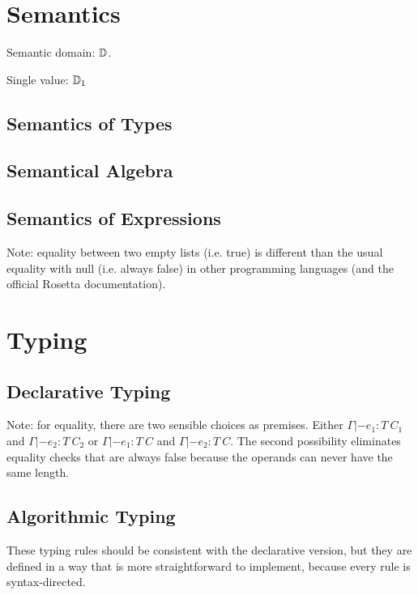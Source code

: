 \documentclass[english,11pt,a4paper]{article}
\begin{document}
\section{Semantics}

Semantic domain: $\mathbb{D}$.

Single value: $\mathbb{D}_1$

\subsection{Semantics of Types}


\subsection{Semantical Algebra}


\subsection{Semantics of Expressions}


Note: equality between two empty lists (i.e. true) is different than the usual equality with null (i.e. always false) in other programming languages (and the official Rosetta documentation).


\section{Typing}

\subsection{Declarative Typing}



Note: for equality, there are two sensible choices as premises. Either $\Gamma |- e_1 : T\ C_1$ and $\Gamma |- e_2 : T\ C_2$ or $\Gamma |- e_1 : T\ C$ and $\Gamma |- e_2 : T\ C$. The second possibility eliminates equality checks that are always false because the operands can never have the same length.

\subsection{Algorithmic Typing}

These typing rules should be consistent with the declarative version, but they are defined in a way that is more straightforward to implement, because every rule is syntax-directed.


\end{document}
